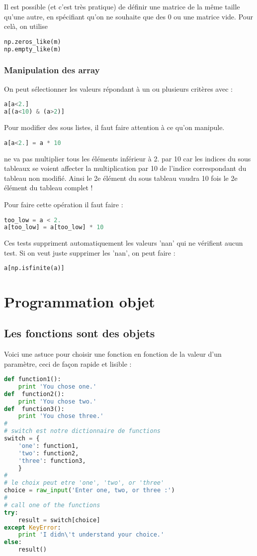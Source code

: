 \documentclass[a4paper,twoside]{article}
\begin{document}
Il est possible (et c'est très pratique) de définir une matrice de la même taille qu'une autre, en spécifiant qu'on ne souhaite que des 0 ou une matrice vide. Pour celà, on utilise
\begin{lstlisting}[language=python]
np.zeros_like(m)
np.empty_like(m)
\end{lstlisting}

\subsubsection{Manipulation des array}
On peut sélectionner les valeurs répondant à un ou plusieurs critères avec :
\begin{lstlisting}[language=python]
a[a<2.]
a[(a<10) & (a>2)]
\end{lstlisting}

Pour modifier des sous listes, il faut faire attention à ce qu'on manipule. 

\begin{lstlisting}[language=python]
a[a<2.] = a * 10
\end{lstlisting}
ne va pas multiplier tous les éléments inférieur à 2. par 10 car les indices du sous tableaux se voient affecter la multiplication par 10 de l'indice correspondant du tableau non modifié. Ainsi le 2e élément du sous tableau vaudra 10 fois le 2e élément du tableau complet !

Pour faire cette opération il faut faire :
\begin{lstlisting}[language=python]
too_low = a < 2.
a[too_low] = a[too_low] * 10
\end{lstlisting}

\bigskip

Ces tests suppriment automatiquement les valeurs 'nan' qui ne vérifient aucun test. Si on veut juste supprimer les 'nan', on peut faire :
\begin{lstlisting}[language=python]
a[np.isfinite(a)]
\end{lstlisting}



\section{Programmation objet}
\subsection{Les fonctions sont des objets}
Voici une astuce pour choisir une fonction en fonction de la valeur d'un paramètre, ceci de façon rapide et lisible :
\begin{lstlisting}[language=python]
def function1():
    print 'You chose one.'
def  function2():
    print 'You chose two.'
def  function3():
    print 'You chose three.'
#
# switch est notre dictionnaire de functions
switch = {
    'one': function1,
    'two': function2,
    'three': function3,
    }
#
# le choix peut etre 'one', 'two', or 'three'
choice = raw_input('Enter one, two, or three :')
#
# call one of the functions
try:
    result = switch[choice]
except KeyError:
    print 'I didn\'t understand your choice.'
else:
    result()
\end{lstlisting}
\end{document}
